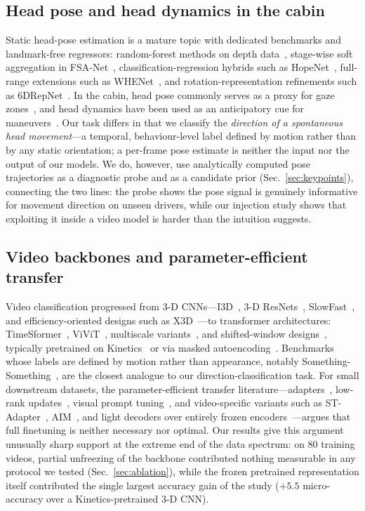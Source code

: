 \documentclass[journal]{IEEEtran}
\newcommand{\micro}{micro-accuracy}
\begin{document}
\subsection{Head pose and head dynamics in the cabin}
Static head-pose estimation is a mature topic with dedicated benchmarks and
landmark-free regressors: random-forest methods on depth
data~\cite{fanelli2013biwi}, stage-wise soft aggregation in
FSA-Net~\cite{yang2019fsanet}, classification-regression hybrids such as
HopeNet~\cite{ruiz2018hopenet}, full-range extensions such as
WHENet~\cite{zhou2020whenet}, and rotation-representation refinements such
as 6DRepNet~\cite{hempel2022sixdrepnet}.  In the cabin, head pose commonly
serves as a proxy for gaze zones~\cite{vora2018gaze}, and head dynamics
have been used as an anticipatory cue for maneuvers~\cite{jain2015brain4cars}.
Our task differs in that we classify the \emph{direction of a spontaneous
head movement}---a temporal, behaviour-level label defined by motion rather
than by any static orientation; a per-frame pose estimate is neither the
input nor the output of our models.  We do, however, use analytically
computed pose trajectories as a diagnostic probe and as a candidate prior
(Sec.~\ref{sec:keypoints}), connecting the two lines: the probe shows the
pose signal is genuinely informative for movement direction on unseen
drivers, while our injection study shows that exploiting it inside a video
model is harder than the intuition suggests.

\subsection{Video backbones and parameter-efficient transfer}
Video classification progressed from 3-D
CNNs---I3D~\cite{carreira2017i3d}, 3-D
ResNets~\cite{hara2018spatiotemporal},
SlowFast~\cite{feichtenhofer2019slowfast}, and efficiency-oriented designs
such as X3D~\cite{feichtenhofer2020x3d}---to transformer architectures:
TimeSformer~\cite{bertasius2021timesformer}, ViViT~\cite{arnab2021vivit},
multiscale variants~\cite{fan2021mvit}, and shifted-window
designs~\cite{liu2022videoswin}, typically pretrained on
Kinetics~\cite{kay2017kinetics} or via masked
autoencoding~\cite{tong2022videomae}.  Benchmarks whose labels are defined
by motion rather than appearance, notably
Something-Something~\cite{goyal2017something}, are the closest analogue to
our direction-classification task.  For small downstream datasets, the
parameter-efficient transfer literature---adapters~\cite{houlsby2019adapters},
low-rank updates~\cite{hu2022lora}, visual prompt
tuning~\cite{jia2022vpt}, and video-specific variants such as
ST-Adapter~\cite{pan2022stadapter}, AIM~\cite{yang2023aim}, and light
decoders over entirely frozen encoders~\cite{lin2022frozenclip}---argues
that full finetuning is neither necessary nor optimal.  Our results give
this argument unusually sharp support at the extreme end of the data
spectrum: on 80 training videos, partial unfreezing of the backbone
contributed nothing measurable in any protocol we tested
(Sec.~\ref{sec:ablation}), while the frozen pretrained representation
itself contributed the single largest accuracy gain of the study
($+5.5$ \micro{} over a Kinetics-pretrained 3-D CNN).
\end{document}
